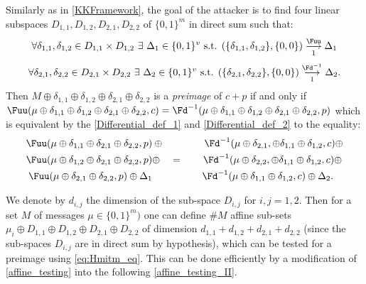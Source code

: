 Similarly as in \autoref{KKFramework}, the goal of the attacker is to find four linear subspaces
$D_{1,1}, D_{1,2}, D_{2,1}, D_{2,2}$ of $\{0,1\}^m$ in direct sum such that:
\begin{equation}
\forall \delta_{1,1} , \delta_{1,2} \in D_{1,1} \times D_{1,2}~\exists~ \Delta_1 \in \{0,1\}^v \text{ s.t. }
(\{\delta_{1,1}, \delta_{1,2}\}, \{0,0\})
\overset{\Fuu}{\underset{1}{\longrightarrow}} \Delta_1
\label{Differential_def_1}
\end{equation}
\vspace{-4mm}
\begin{equation}
\forall \delta_{2,1} , \delta_{2,2} \in D_{2,1} \times D_{2,2}~\exists~ \Delta_2 \in \{0,1\}^v \text{ s.t. }
(\{\delta_{2,1}, \delta_{2,2}\}, \{0,0\})
\overset{\Fd^{-1}}{\underset{1}{\longrightarrow}} \Delta_2.
\label{Differential_def_2}
\end{equation}
Then $M \oplus \delta_{1,1} \oplus \delta_{1,2} \oplus \delta_{2,1} \oplus \delta_{2,2}$ 
is a \emph{preimage} of $c+p$ if and only if $
    \Fuu(\mu \oplus \delta_{1,1} \oplus \delta_{1,2} \oplus 
    \delta_{2,1} \oplus \delta_{2,2}, c) = 
    \Fd^{-1}(\mu \oplus \delta_{1,1} \oplus \delta_{1,2} \oplus 
    \delta_{2,1} \oplus \delta_{2,2}, p) $
which is equivalent by the \autoref{Differential_def_1} 
and \autoref{Differential_def_2} to the equality: 
\begin{equation}
  \label{eq:Hmitm_eq}
  \begin{split}
  \Fuu(\mu \oplus \delta_{1,1} \oplus \delta_{2,1} \oplus \delta_{2,2}, p) & 
    \oplus \quad \qquad \quad 
    \Fd^{-1}(\mu \oplus \delta_{2,1},\oplus \delta_{1,1} \oplus \delta_{1,2}, c) \oplus \\
    \Fuu(\mu \oplus \delta_{1,2} \oplus \delta_{2,1} \oplus \delta_{2,2}, p) & 
    \oplus\quad  = \quad \quad   
    \Fd^{-1}(\mu \oplus \delta_{2,2}, \oplus \delta_{1,1} \oplus \delta_{1,2}, c) \oplus \\ 
    \Fuu(\mu \oplus \delta_{2,1} \oplus \delta_{2,2}, p) \oplus \Delta_1 & 
    \qquad \quad \quad \quad   
    \Fd^{-1}(\mu \oplus \delta_{1,1}  \oplus \delta_{1,2}, c) \oplus \Delta_2.
    \end{split}
\end{equation}

We denote by $d_{i,j}$ the dimension of the 
sub-space $D_{i,j}$ for $i,j=1,2$. Then for a set $M$ of messages $\mu \in \{0,1\}^m)$ one can define $\# M$ affine sub-sets 
$\mu_i \oplus D_{1,1} \oplus D_{1,2} \oplus D_{2,1} \oplus D_{2,2}$ of dimension $d_{1,1} + d_{1,2} + d_{2,1} +d_{2,2}$
(since the sub-spaces $D_{i,j}$ are in direct sum by hypothesis), which can be tested for a preimage using \autoref{eq:Hmitm_eq}.
This can be done efficiently by a modification of \autoref{affine_testing} into the following \autoref{affine_testing_II}.

